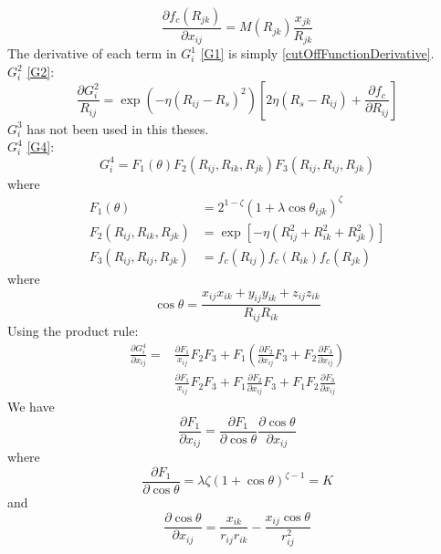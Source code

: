\documentclass[twoside,english]{uiofysmaster}
\begin{document}
\begin{appendices}
\begin{equation}
 \frac{\partial f_c(R_{jk})}{\partial x_{ij}} = M(R_{jk})
 \frac{x_{jk}}{R_{jk}}
 \label{cutOffFunctionDerivative1}
\end{equation}
The derivative of each term in $G_i^1$ \eqref{G1} is simply \eqref{cutOffFunctionDerivative}. \\
$G_i^2$ \eqref{G2}:
\begin{equation}
 \frac{\partial G_i^2}{R_{ij}} = 
 \exp(-\eta(R_{ij}-R_s)^2) \left[2\eta(R_s - R_{ij}) + \frac{\partial f_c}{\partial R_{ij}}\right]
\end{equation}
$G_i^3$ has not been used in this theses. \\
$G_i^4$ \eqref{G4}:
\begin{equation}
 G_i^4 = F_1(\theta)F_2(R_{ij},R_{ik},R_{jk})F_3(R_{ij},R_{ij},R_{jk})
\end{equation}
where
\begin{align}
 F_1(\theta) &= 2^{1-\zeta}(1 + \lambda \cos\theta_{ijk})^\zeta \\
 F_2(R_{ij},R_{ik},R_{jk}) &= \exp[-\eta (R_{ij}^2 + R_{ik}^2 + R_{jk}^2)] \\
 F_3(R_{ij},R_{ij},R_{jk}) &= f_c(R_{ij}) f_c(R_{ik}) f_c (R_{jk})
\end{align}
where
\begin{equation}
 \cos\theta = \frac{x_{ij}x_{ik} + y_{ij}y_{ik} + z_{ij}z_{ik}}{R_{ij}R_{ik}}
\end{equation}
Using the product rule:
\begin{align}
 \frac{\partial G_i^4}{\partial x_{ij}} = &\frac{\partial F_1}{x_{ij}} F_2 F_3 + 
 F_1 \left(\frac{\partial F_2}{\partial x_{ij}}F_3 + F_2\frac{\partial F_3}{\partial x_{ij}}\right) \\
 &\frac{\partial F_1}{x_{ij}} F_2 F_3 + 
 F_1 \frac{\partial F_2}{\partial x_{ij}}F_3 + F_1F_2\frac{\partial F_3}{\partial x_{ij}}
 \label{G4Derivative}
\end{align}
We have
\begin{equation}
 \frac{\partial F_1}{\partial x_{ij}} = \frac{\partial F_1}{\partial\cos\theta}
 \frac{\partial\cos\theta}{\partial x_{ij}}
\end{equation}
where
\begin{equation}
 \frac{\partial F_1}{\partial\cos\theta} = \lambda\zeta(1 + \cos\theta)^{\zeta-1} = K
\end{equation}
and 
\begin{equation}
 \frac{\partial\cos\theta}{\partial x_{ij}} = \frac{x_{ik}}{r_{ij}r_{ik}} - 
 \frac{x_{ij}\cos\theta}{r_{ij}^2}
\end{equation}

\end{appendices}
\end{document}
